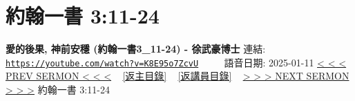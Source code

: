 \documentclass{book}
\begin{document}
\section{約翰一書 3:11-24}
\label{sec:K8E95o7ZcvU}
\textbf{愛的後果, 神前安穩 (約翰一書3\_11-24) - 徐武豪博士}
\newline
\newline
連結: \href{https://youtube.com/watch?v=K8E95o7ZcvU}{\texttt{https://youtube.com/watch?v=K8E95o7ZcvU}} ~~~~ 語音日期: 2025-01-11
\newline
\newline
\hyperref[sec:Y_0n0vkhyDU]{< < < PREV SERMON < < <}
~
\hyperlink{toc}{[返主目錄]}
~
\hyperref[ch:preacher4]{[返講員目錄]}
~
\hyperref[sec:qbcjpAyQDGE]{> > > NEXT SERMON > > >}
\newline
\newline
約翰一書 3:11-24
\newline
\end{document}
